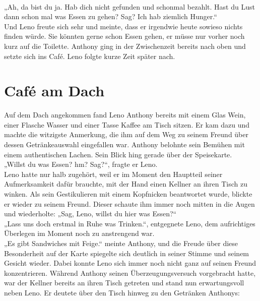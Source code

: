 \documentclass[ngerman,smalldemyvopaper,11pt,oneside,onecolumn,openright,extrafontsizes]{memoir}
\begin{document}
\vspace{0.5em} \\
„Ah, da bist du ja. Hab dich nicht gefunden und schonmal bezahlt. Hast du Lust dann schon mal was Essen zu gehen? Sag? Ich hab ziemlich Hunger.“
\vspace{0.5em} \\
Und Leno freute sich sehr und meinte, dass er irgendwie heute sowieso nichts finden würde. Sie könnten gerne schon Essen gehen, er müsse nur vorher noch kurz auf die Toilette. Anthony ging in der Zwischenzeit bereits nach oben und setzte sich ins Café. Leno folgte kurze Zeit später nach.\\

\chapter{Café am Dach}
Auf dem Dach angekommen fand Leno Anthony bereits mit einem Glas Wein, einer Flasche Wasser und einer Tasse Kaffee am Tisch sitzen. Er kam dazu und machte die witzigste Anmerkung, die ihm auf dem Weg zu seinem Freund über dessen Getränkeauswahl eingefallen war. Anthony belohnte sein Bemühen mit einem authentischen Lachen. Sein Blick hing gerade über der Speisekarte.
\vspace{0.5em} \\
„Willst du was Essen? hm? Sag?“, fragte er Leno.
\vspace{0.5em} \\
Leno hatte nur halb zugehört, weil er im Moment den Hauptteil seiner Aufmerksamkeit dafür brauchte, mit der Hand einen Kellner an ihren Tisch zu winken. Als sein Gestikulieren mit einem Kopfnicken beantwortet wurde, blickte er wieder zu seinem Freund. Dieser schaute ihm immer noch mitten in die Augen und wiederholte:
„Sag, Leno, willst du hier was Essen?“
\vspace{0.5em} \\
„Lass uns doch erstmal in Ruhe was Trinken.“, entgegnete Leno, dem aufrichtiges Überlegen im Moment noch zu anstrengend war.
\vspace{0.5em} \\
„Es gibt Sandwiches mit Feige.“ meinte Anthony, und die Freude über diese Besonderheit auf der Karte spiegelte sich deutlich in seiner Stimme und seinem Gesicht wieder. Dabei konnte Leno sich immer noch nicht ganz auf seinen Freund konzentrieren. Während Anthony seinen Überzeugungsversuch vorgebracht hatte, war der Kellner bereits an ihren Tisch getreten und stand nun erwartungsvoll neben Leno. Er deutete über den Tisch hinweg zu den Getränken Anthonys:
\end{document}
